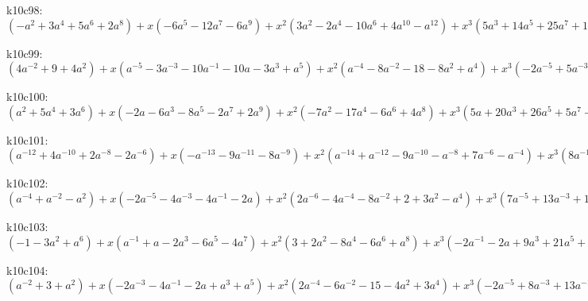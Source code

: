 k10c98: $ (-a^{2}+3a^{4}+5a^{6}+2a^{8}) +x(-6a^{5}-12a^{7}-6a^{9}) +x^{2}(3a^{2}-2a^{4}-10a^{6}+4a^{10}-a^{12}) +x^{3}(5a^{3}+14a^{5}+25a^{7}+14a^{9}-2a^{11}) +x^{4}(-3a^{2}+4a^{4}+17a^{6}+2a^{8}-7a^{10}+a^{12}) +x^{5}(-8a^{3}-17a^{5}-26a^{7}-14a^{9}+3a^{11}) +x^{6}(a^{2}-9a^{4}-23a^{6}-7a^{8}+6a^{10}) +x^{7}(3a^{3}+3a^{5}+8a^{7}+8a^{9}) +x^{8}(4a^{4}+10a^{6}+6a^{8}) +x^{9}(2a^{5}+2a^{7}) $

k10c99: $ (4a^{-2}+9+4a^{2}) +x(a^{-5}-3a^{-3}-10a^{-1}-10a-3a^{3}+a^{5}) +x^{2}(a^{-4}-8a^{-2}-18-8a^{2}+a^{4}) +x^{3}(-2a^{-5}+5a^{-3}+21a^{-1}+21a+5a^{3}-2a^{5}) +x^{4}(-5a^{-4}+9a^{-2}+28+9a^{2}-5a^{4}) +x^{5}(a^{-5}-9a^{-3}-18a^{-1}-18a-9a^{3}+a^{5}) +x^{6}(3a^{-4}-9a^{-2}-24-9a^{2}+3a^{4}) +x^{7}(5a^{-3}+5a^{-1}+5a+5a^{3}) +x^{8}(5a^{-2}+10+5a^{2}) +x^{9}(2a^{-1}+2a) $

k10c100: $ (a^{2}+5a^{4}+3a^{6}) +x(-2a-6a^{3}-8a^{5}-2a^{7}+2a^{9}) +x^{2}(-7a^{2}-17a^{4}-6a^{6}+4a^{8}) +x^{3}(5a+20a^{3}+26a^{5}+5a^{7}-5a^{9}+a^{11}) +x^{4}(17a^{2}+36a^{4}+5a^{6}-11a^{8}+3a^{10}) +x^{5}(-4a-11a^{3}-27a^{5}-14a^{7}+6a^{9}) +x^{6}(-13a^{2}-33a^{4}-12a^{6}+8a^{8}) +x^{7}(a-3a^{3}+4a^{5}+8a^{7}) +x^{8}(3a^{2}+9a^{4}+6a^{6}) +x^{9}(2a^{3}+2a^{5}) $

k10c101: $ (a^{-12}+4a^{-10}+2a^{-8}-2a^{-6}) +x(-a^{-13}-9a^{-11}-8a^{-9}) +x^{2}(a^{-14}+a^{-12}-9a^{-10}-a^{-8}+7a^{-6}-a^{-4}) +x^{3}(8a^{-13}+28a^{-11}+26a^{-9}+4a^{-7}-2a^{-5}) +x^{4}(-2a^{-14}+3a^{-12}+15a^{-10}+a^{-8}-8a^{-6}+a^{-4}) +x^{5}(-11a^{-13}-31a^{-11}-31a^{-9}-8a^{-7}+3a^{-5}) +x^{6}(a^{-14}-11a^{-12}-24a^{-10}-6a^{-8}+6a^{-6}) +x^{7}(4a^{-13}+7a^{-11}+10a^{-9}+7a^{-7}) +x^{8}(5a^{-12}+11a^{-10}+6a^{-8}) +x^{9}(2a^{-11}+2a^{-9}) $

k10c102: $ (a^{-4}+a^{-2}-a^{2}) +x(-2a^{-5}-4a^{-3}-4a^{-1}-2a) +x^{2}(2a^{-6}-4a^{-4}-8a^{-2}+2+3a^{2}-a^{4}) +x^{3}(7a^{-5}+13a^{-3}+16a^{-1}+7a-3a^{3}) +x^{4}(-3a^{-6}+8a^{-4}+21a^{-2}+3-6a^{2}+a^{4}) +x^{5}(-9a^{-5}-14a^{-3}-17a^{-1}-9a+3a^{3}) +x^{6}(a^{-6}-11a^{-4}-24a^{-2}-7+5a^{2}) +x^{7}(3a^{-5}+a^{-3}+4a^{-1}+6a) +x^{8}(4a^{-4}+9a^{-2}+5) +x^{9}(2a^{-3}+2a^{-1}) $

k10c103: $ (-1-3a^{2}+a^{6}) +x(a^{-1}+a-2a^{3}-6a^{5}-4a^{7}) +x^{2}(3+2a^{2}-8a^{4}-6a^{6}+a^{8}) +x^{3}(-2a^{-1}-2a+9a^{3}+21a^{5}+10a^{7}-2a^{9}) +x^{4}(-6+25a^{4}+13a^{6}-6a^{8}) +x^{5}(a^{-1}-5a-9a^{3}-16a^{5}-12a^{7}+a^{9}) +x^{6}(3-5a^{2}-23a^{4}-12a^{6}+3a^{8}) +x^{7}(4a+2a^{3}+3a^{5}+5a^{7}) +x^{8}(4a^{2}+9a^{4}+5a^{6}) +x^{9}(2a^{3}+2a^{5}) $

k10c104: $ (a^{-2}+3+a^{2}) +x(-2a^{-3}-4a^{-1}-2a+a^{3}+a^{5}) +x^{2}(2a^{-4}-6a^{-2}-15-4a^{2}+3a^{4}) +x^{3}(-2a^{-5}+8a^{-3}+13a^{-1}+4a-a^{3}-2a^{5}) +x^{4}(-6a^{-4}+12a^{-2}+27+3a^{2}-6a^{4}) +x^{5}(a^{-5}-11a^{-3}-12a^{-1}-6a-5a^{3}+a^{5}) +x^{6}(3a^{-4}-11a^{-2}-22-5a^{2}+3a^{4}) +x^{7}(5a^{-3}+3a^{-1}+2a+4a^{3}) +x^{8}(5a^{-2}+9+4a^{2}) +x^{9}(2a^{-1}+2a) $

